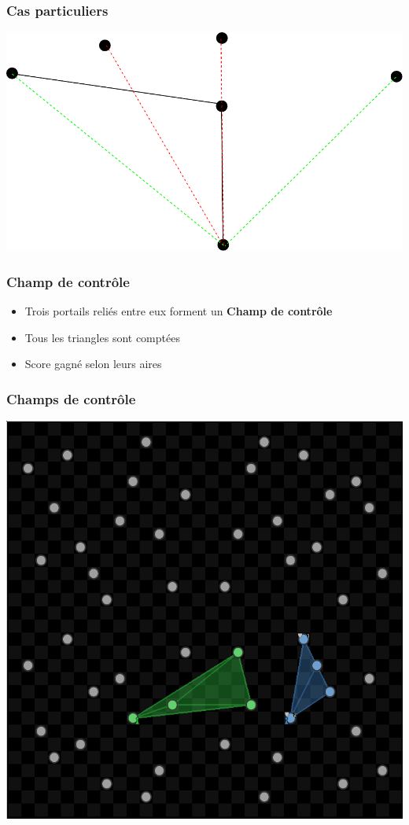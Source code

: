 \documentclass{beamer}
\begin{document}
\begin{frame}
	\frametitle{Cas particuliers}
    \begin{center}
    \includegraphics[height=0.7\textheight]{interference.pdf}
    \end{center}
\end{frame}


\begin{frame}
	\frametitle{Champ de contrôle}
    \begin{itemize}
        \item Trois portails reliés entre eux forment un \textbf{Champ de contrôle}
        \item Tous les triangles sont comptées
        \item Score gagné selon leurs aires
    \end{itemize}
\end{frame}

\begin{frame}
    \begin{center}
        \frametitle{Champs de contrôle}
        \includegraphics[height=0.8\textheight]{gui_triangle}
    \end{center}
\end{frame}
\end{document}
